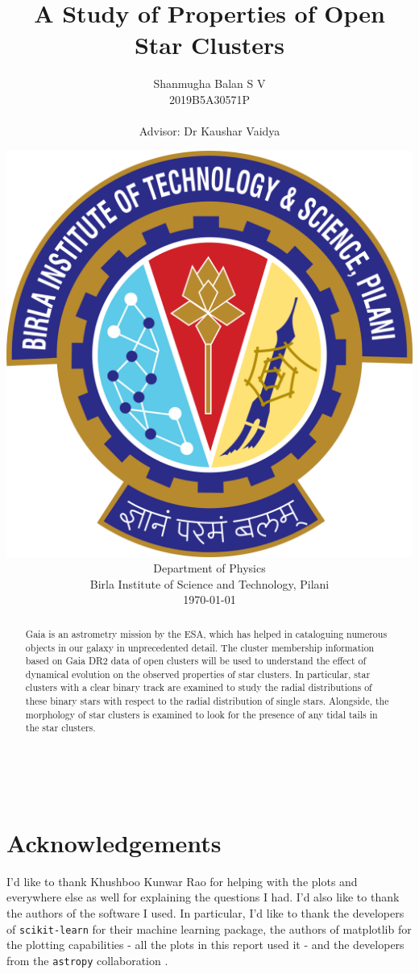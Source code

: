 \documentclass[12pt,a4paper,oneside,openright]{report}
\title{A Study of Properties of Open Star Clusters}
\author{Shanmugha Balan S V \\ 2019B5A30571P \\[1cm]\\{\small Advisor: Dr Kaushar Vaidya}\\[1cm]}
\date{\includegraphics[scale=0.1]{logo} \\ Department of Physics\\ Birla Institute of Science and Technology, Pilani\\[5mm] \today}
\begin{document}
\pagestyle{empty}

\maketitle	
\cleardoublepage

\newpage 
\ %
\newpage

\singlespacing
{}
\pagestyle{plain}
	
\begin{abstract}
Gaia is an astrometry mission by the ESA, which has helped in cataloguing numerous objects in our galaxy in unprecedented detail. The cluster membership information based on Gaia DR2 data of open clusters will be used to understand the effect of dynamical evolution on the observed properties of star clusters. In particular, star clusters with a clear binary track are examined to study the radial distributions of these binary stars with respect to the radial distribution of single stars. Alongside, the morphology of star clusters is examined to look for the presence of any tidal tails in the star clusters. 
\end{abstract}	

\cleardoublepage

\tableofcontents

\cleardoublepage

\pagestyle{fancy}
\singlespacing
{}	





\singlespacing

\chapter*{Acknowledgements}
I'd like to thank Khushboo Kunwar Rao for helping with the plots and everywhere else as well for explaining the questions I had. I'd also like to thank the authors of the software I used. In particular, I'd like to thank the developers of \lstinline{scikit-learn} \citep{scikit-learn} for their machine learning package, the authors of matplotlib for the plotting capabilities - all the plots in this report used it - and the developers from the \lstinline{astropy} collaboration \citep{astropy}.


\nocite{*}
	

	
\end{document}
